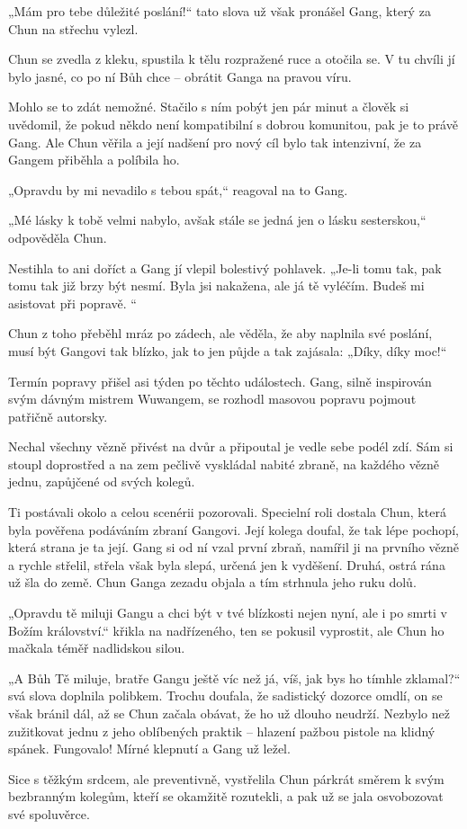 „Mám pro tebe důležité poslání!“ tato slova už však pronášel Gang, který za Chun na střechu vylezl.

Chun se zvedla z kleku, spustila k tělu rozpražené ruce a otočila se. V tu chvíli jí bylo jasné, co po ní Bůh chce – obrátit Ganga na pravou víru.

Mohlo se to zdát nemožné. Stačilo s ním pobýt jen pár minut a člověk si uvědomil, že pokud někdo není kompatibilní s dobrou komunitou, pak je to právě Gang. Ale Chun věřila a její nadšení pro nový cíl bylo tak intenzivní, že za Gangem přiběhla a políbila ho.

„Opravdu by mi nevadilo s tebou spát,“ reagoval na to Gang.

„Mé lásky k tobě velmi nabylo, avšak stále se jedná jen o lásku sesterskou,“ odpověděla Chun.

Nestihla to ani doříct a Gang jí vlepil bolestivý pohlavek. „Je-li tomu tak, pak tomu tak již brzy být nesmí. Byla jsi nakažena, ale já tě vyléčím. Budeš mi asistovat při popravě. “

Chun z toho přeběhl mráz po zádech, ale věděla, že aby naplnila své poslání, musí být Gangovi tak blízko, jak to jen půjde a tak zajásala: „Díky, díky moc!“
\vspace{0.75cm}

Termín popravy přišel asi týden po těchto událostech. Gang, silně inspirován svým dávným mistrem Wuwangem, se rozhodl masovou popravu pojmout patřičně autorsky. 

Nechal všechny vězně přivést na dvůr a připoutal je vedle sebe podél zdí. Sám si stoupl doprostřed a na zem pečlivě vyskládal nabité zbraně, na každého vězně jednu, zapůjčené od svých kolegů.

Ti postávali okolo a celou scenérii pozorovali. Specielní roli dostala Chun, která byla pověřena podáváním zbraní Gangovi. Její kolega doufal, že tak lépe pochopí, která strana je ta její. Gang si od ní vzal první zbraň, namířil ji na prvního vězně a rychle střelil, střela však byla slepá, určená jen k vyděšení. Druhá, ostrá rána už šla do země. Chun Ganga zezadu objala a tím strhnula jeho ruku dolů. 

„Opravdu tě miluji Gangu a chci být v tvé blízkosti nejen nyní, ale i po smrti v Božím království.“ křikla na nadřízeného, ten se pokusil vyprostit, ale Chun ho mačkala téměř nadlidskou silou. 

„A Bůh Tě miluje, bratře Gangu ještě víc než já, víš, jak bys ho tímhle zklamal?“ svá slova doplnila polibkem. Trochu doufala, že sadistický dozorce omdlí, on se však bránil dál, až se Chun začala obávat, že ho už dlouho neudrží. Nezbylo než zužitkovat jednu z jeho oblíbených praktik – hlazení pažbou pistole na klidný spánek. Fungovalo! Mírné klepnutí a Gang už ležel.

Sice s těžkým srdcem, ale preventivně, vystřelila Chun párkrát směrem k svým bezbranným kolegům, kteří se okamžitě rozutekli, a pak už se jala osvobozovat své spoluvěrce.
